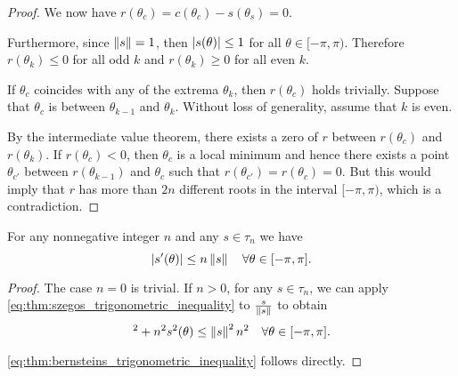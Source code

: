 \begin{proof}
  We now have \( r(\theta_c) = c(\theta_c) - s(\theta_s) = 0 \).

  Furthermore, since \( \left\Vert s \right\Vert = 1 \), then \( \left\vert s(\theta) \right\vert \leq 1 \) for all \( \theta \in [-\pi, \pi) \). Therefore \( r(\theta_k) \leq 0 \) for all odd \( k \) and \( r(\theta_k) \geq 0 \) for all even \( k \).

  If \( \theta_c \) coincides with any of the extrema \( \theta_k \), then \( r(\theta_c) \) holds trivially. Suppose that \( \theta_c \) is between \( \theta_{k-1} \) and \( \theta_k \). Without loss of generality, assume that \( k \) is even.

  By the intermediate value theorem, there exists a zero of \( r \) between \( r(\theta_c) \) and \( r(\theta_k) \). If \( r(\theta_c) < 0 \), then \( \theta_c \) is a local minimum and hence there exists a point \( \theta_{c'} \) between \( r(\theta_{k-1}) \) and \( \theta_c \) such that \( r(\theta_{c'}) = r(\theta_c) = 0 \). But this would imply that \( r \) has more than \( 2n \) different roots in the interval \( [-\pi, \pi) \), which is a contradiction.
\end{proof}

\begin{corollary}\label{thm:bernsteins_trigonometric_inequality}
  For any nonnegative integer \( n \) and any \( s \in \tau_n \) we have
  \begin{equation}\label{eq:thm:bernsteins_trigonometric_inequality}
    \left\vert s'(\theta) \right\vert \leq n \left\Vert s \right\Vert \quad\forall \theta \in [-\pi, \pi].
  \end{equation}
\end{corollary}
\begin{proof}
  The case \( n = 0 \) is trivial. If \( n > 0 \), for any \( s \in \tau_n \), we can apply \eqref{eq:thm:szegos_trigonometric_inequality} to \( \frac s {\left\Vert s \right\Vert} \) to obtain
  \begin{equation}
    [s'(\theta)]^2 + n^2 s^2 (\theta) \leq \Norm{s}^2 n^2 \quad\forall \theta \in [-\pi, \pi].
  \end{equation}

  \eqref{eq:thm:bernsteins_trigonometric_inequality} follows directly.
\end{proof}

